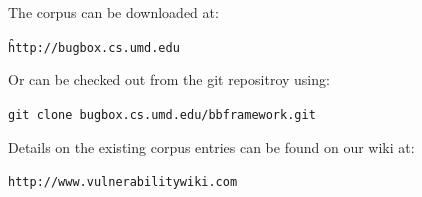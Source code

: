 \documentclass[letterpaper,twocolumn,10pt]{article}
\begin{document}
The corpus can be downloaded at:

\begin{center}
{\tt \f http://bugbox.cs.umd.edu}
\end{center}

Or can be checked out from the git repositroy using:

\begin{center}
{\tt git clone bugbox.cs.umd.edu/bbframework.git}
\end{center}

Details on the existing corpus entries can be found on our wiki at:

\begin{center}
{\tt http://www.vulnerabilitywiki.com}
\end{center}

{\footnotesize 
}
\end{document}
